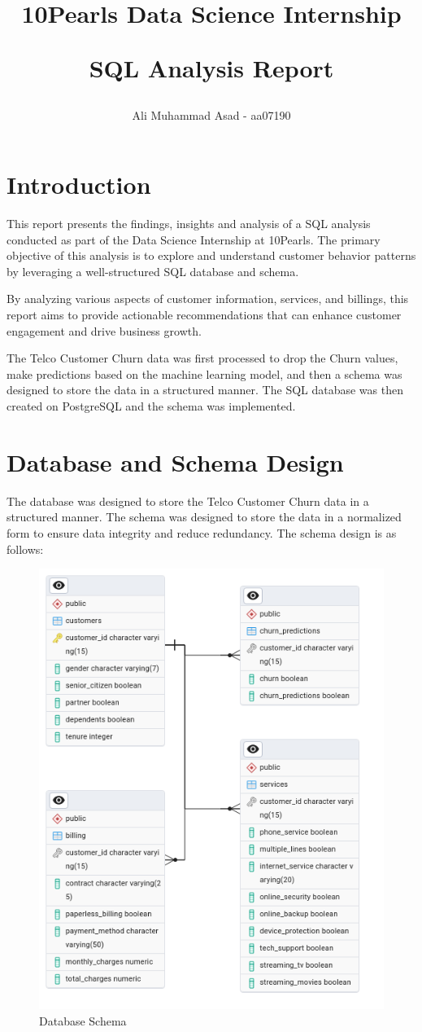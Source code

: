 \documentclass{article}
\title{{\huge \textbf{10Pearls Data Science Internship}}

{\LARGE \textbf{SQL Analysis Report}} \\ \vspace*{2mm}
}
\author{Ali Muhammad Asad - aa07190}
\date{}
\theoremstyle{mytheoremstyle}
\theoremstyle{mytheoremstyle}
\theoremstyle{myproblemstyle}
\begin{document}
\maketitle

\tableofcontents

\newpage
\section{Introduction}
This report presents the findings, insights and analysis of a SQL analysis conducted as part of the Data Science Internship at 10Pearls. The primary objective of this analysis is to explore and understand customer behavior patterns by leveraging a well-structured SQL database and schema.

By analyzing various aspects of customer information, services, and billings, this report aims to provide actionable recommendations that can enhance customer engagement and drive business growth. 

The Telco Customer Churn data was first processed to drop the Churn values, make predictions based on the machine learning model, and then a schema was designed to store the data in a structured manner. The SQL database was then created on PostgreSQL and the schema was implemented.

\newpage
\section{Database and Schema Design}
The database was designed to store the Telco Customer Churn data in a structured manner. The schema was designed to store the data in a normalized form to ensure data integrity and reduce redundancy. The schema design is as follows:
\begin{figure}[h]
    \centering
    \includegraphics[width=0.8\linewidth]{../assets/schema.png}
    \caption{Database Schema}
\end{figure}
\end{document}
